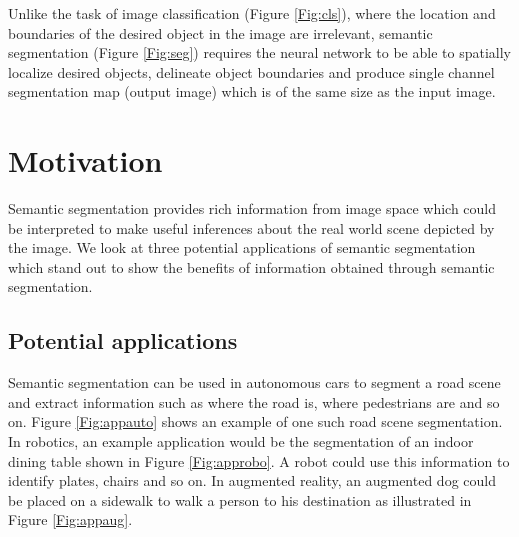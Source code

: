 Unlike the task of image classification (Figure \ref{Fig:cls}), where the location and boundaries of the desired object in the image are irrelevant, semantic segmentation (Figure \ref{Fig:seg}) requires the neural network to be able to spatially localize desired objects, delineate object boundaries and produce single channel segmentation map (output image) which is of the same size as the input image.

\section{Motivation}

Semantic segmentation provides rich information from image space which could be interpreted to make useful inferences about the real world scene depicted by the image. We look at three potential applications of semantic segmentation which stand out to show the benefits of information obtained through semantic segmentation. 

\subsection{Potential applications}

Semantic segmentation can be used in autonomous cars to segment a road scene and extract information such as where the road is, where pedestrians are and so on. Figure \ref{Fig:appauto} shows an example of one such road scene segmentation. In robotics, an example application would be the segmentation of an indoor dining table shown in Figure \ref{Fig:approbo}. A robot could use this information to identify plates, chairs and so on. In augmented reality, an augmented dog could be placed on a sidewalk to walk a person to his destination as illustrated in Figure \ref{Fig:appaug}. 

